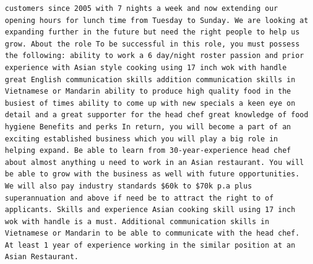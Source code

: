 \documentclass[11pt,a4paper,]{article}
\begin{document}
\begin{verbatim}
customers since 2005 with 7 nights a week and now extending our opening hours for lunch time from Tuesday to Sunday. We are looking at expanding further in the future but need the right people to help us grow. About the role To be successful in this role, you must possess the following: ability to work a 6 day/night roster passion and prior experience with Asian style cooking using 17 inch wok with handle great English communication skills addition communication skills in Vietnamese or Mandarin ability to produce high quality food in the busiest of times ability to come up with new specials a keen eye on detail and a great supporter for the head chef great knowledge of food hygiene Benefits and perks In return, you will become a part of an exciting established business which you will play a big role in helping expand. Be able to learn from 30-year-experience head chef about almost anything u need to work in an Asian restaurant. You will be able to grow with the business as well with future opportunities. We will also pay industry standards $60k to $70k p.a plus superannuation and above if need be to attract the right to of applicants. Skills and experience Asian cooking skill using 17 inch wok with handle is a must. Additional communication skills in Vietnamese or Mandarin to be able to communicate with the head chef. At least 1 year of experience working in the similar position at an Asian Restaurant.

\end{verbatim}
\end{document}
